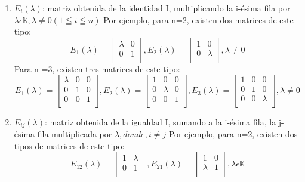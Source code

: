 \documentclass[b5paper, 11pt]{book}
\newcommand{\0}{\mathbf{0}}
\theoremstyle{estiloB}
\theoremstyle{estiloC}
\theoremstyle{estiloD}
\theoremstyle{estiloE}
\begin{document}
\begin{enumerate}
\item $E_i(\lambda)$: matriz obtenida de la identidad I, multiplicando la i-\'{e}sima fila por $\lambda \epsilon \mathbb{K}, \lambda \not= 0 (1 \leqq i  \leqq n) $
Por ejemplo, para n=2, existen dos matrices de este tipo:
\begin{equation*}
 E_1(\lambda) = \begin{bmatrix}
 \lambda &  0  \\
 0 &  1  \\
\end{bmatrix},
 E_2(\lambda ) = \begin{bmatrix}
 1 &  0  \\
 0 &  \lambda  \\
\end{bmatrix}
,  \lambda \not= 0
\end{equation*}
Para n =3, existen tres matrices de este tipo:
\begin{equation*}
 E_1(\lambda) = \begin{bmatrix}
 \lambda &  0 & 0 \\
 0 &  1 & 0 \\
 0 &  0 & 1 \\
\end{bmatrix},
 E_2(\lambda) = \begin{bmatrix}
 1 &  0 & 0 \\
 0 &  \lambda & 0 \\
 0 &  0 & 1 \\
\end{bmatrix},
 E_3(\lambda) = \begin{bmatrix}
 1 &  0 & 0 \\
 0 &  1 & 0 \\
 0 &  0 & \lambda \\
\end{bmatrix},\lambda \not= 0
\end{equation*}
\item $E_{ij}(\lambda)$: matriz obtenida de la igualdad I, sumando a la i-\'{e}sima fila, la j-\'{e}sima fila multiplicada por $\lambda, donde, i \not= j$
Por ejemplo, para n=2, existen dos tipos de matrices de este tipo:
\begin{equation*}
E_12(\lambda) = \begin{bmatrix}
 1 &\lambda   \\
 0 &  1  \\
\end{bmatrix},
 E_21(\lambda ) = \begin{bmatrix}
 1 &  0  \\
 \lambda & 1  \\
\end{bmatrix}
,  \lambda \epsilon \mathbb{K}
\end{equation*} 


\end{enumerate}
\end{document}
